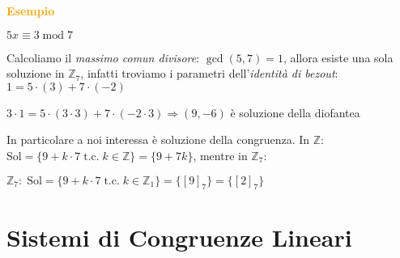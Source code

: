\begin{boxA}
    \textcolor{orange}{\textbf{Esempio}}

    {\centering
        $5x \equiv 3 \; \text{mod} \; 7$
    \par}
    Calcoliamo il \textit{massimo comun divisore}: $\gcd (5, 7) = 1$, allora esiste una sola soluzione in $\mathbb{Z}_7$, infatti troviamo i parametri dell'\textit{identità di bezout}: $1 = 5 \cdot (3) + 7 \cdot (-2)$

    {\centering
        $3 \cdot 1 = 5 \cdot (3 \cdot 3) + 7 \cdot (-2 \cdot 3) \Rightarrow (9, -6)$ è soluzione della diofantea
    \par}
    In particolare a noi interessa  è soluzione della congruenza. In $\mathbb{Z}$: $\text{Sol} = \{9 + k \cdot 7 \; \text{t.c.} \; k \in \mathbb{Z}\} = \{9 + 7k\}$, mentre in $\mathbb{Z}_7$:

    {\centering
        $\mathbb{Z}_7: \; \text{Sol} = \{9 + k \cdot 7 \; \text{t.c.} \; k \in \mathbb{Z}_1\} = \{[9]_7\} = \{[2]_7\}$
    \par}
\end{boxA}

\section{Sistemi di Congruenze Lineari}

